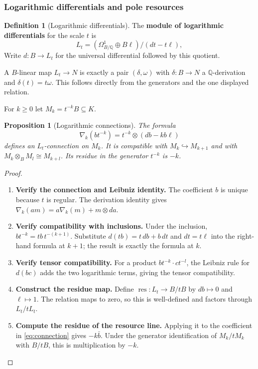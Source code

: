 \documentclass[11pt,a4paper]{article}
\numberwithin{algorithm}{section}
\numberwithin{equation}{section}
\newtheorem{proposition}[proposition]{Proposition}
\theoremstyle{definition}
\newtheorem{definition}[definition]{Definition}
\theoremstyle{remark}
\theoremstyle{plain}
\newcommand{\QQ}{\mathbb Q}
\newcommand{\incl}{\hookrightarrow}
\theoremstyle{definition}
\theoremstyle{plain}
\begin{document}
\subsubsection{Logarithmic differentials and pole resources}


\begin{definition}[Logarithmic differentials]\label{def:logarithmic-differentials}
The \textbf{module of logarithmic differentials} for the scale $t$ is
\[
 L_t=(\Omega^1_{B/\QQ}\oplus B\ell)/(dt-t\ell),
\]
Write $d:B\to L_t$ for the universal differential
followed by this quotient.
\end{definition}


A $B$-linear map $L_t\to N$ is exactly a pair
$(\delta,\omega)$ with $\delta:B\to N$ a $\QQ$-derivation
and $\delta(t)=t\omega$. This follows directly from the
generators and the one displayed relation.

For $k\ge0$ let $M_k=t^{-k}B\subseteq K$.
\begin{proposition}[Logarithmic connections]\label{prop:log-connection}
The formula
\begin{equation}\label{eq:connection}
 \nabla_k(bt^{-k})=t^{-k}\otimes(db-kb\ell)
\end{equation}
defines an $L_t$-connection on $M_k$.
It is compatible with $M_k\incl M_{k+1}$ and with
$M_k\otimes_BM_l\cong M_{k+l}$.
Its residue in the generator $t^{-k}$ is $-k$.
\end{proposition}
\begin{proof}\leavevmode
\begin{enumerate}[leftmargin=*,align=left]
\item \textbf{Verify the connection and Leibniz identity.}
The coefficient $b$ is unique because $t$ is regular.
The derivation identity gives
$\nabla_k(am)=a\nabla_k(m)+m\otimes da$.

\item \textbf{Verify compatibility with inclusions.}
Under the inclusion, $bt^{-k}=tb\,t^{-(k+1)}$.
Substitute $d(tb)=t\,db+b\,dt$ and $dt=t\ell$ into
the right-hand formula at $k+1$; the result is exactly
the formula at $k$.

\item \textbf{Verify tensor compatibility.}
For a product
$bt^{-k}\cdot ct^{-l}$, the Leibniz rule for $d(bc)$
adds the two logarithmic terms, giving the tensor
compatibility.

\item \textbf{Construct the residue map.}
Define $\operatorname{res}:L_t\to B/tB$ by $db\mapsto0$
and $\ell\mapsto1$. The relation maps to zero, so this
is well-defined and factors through $L_t/tL_t$.

\item \textbf{Compute the residue of the resource line.}
Applying it to the coefficient in
\eqref{eq:connection} gives $-k\bar b$.
Under the generator identification of $M_k/tM_k$ with
$B/tB$, this is multiplication by $-k$.
\end{enumerate}
\end{proof}
\end{document}
